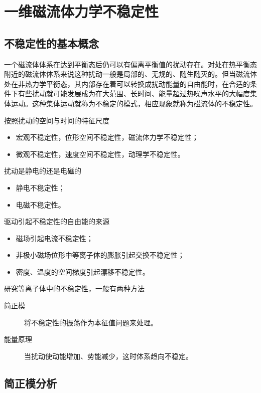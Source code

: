 
\chapter{一维磁流体力学不稳定性}

\section{不稳定性的基本概念}

一个磁流体体系在达到平衡态后仍可以有偏离平衡值的扰动存在。对处在热平衡态附近的磁流体体系来说这种扰动一般是局部的、无规的、随生随灭的。但当磁流体处在非热力学平衡态，其内部存在着可以转换成扰动能量的自由能时，在合适的条件下有些扰动就可能发展成为在大范围、长时间、能量超过热噪声水平的大幅度集体运动。这种集体运动就称为不稳定的模式，相应现象就称为磁流体的不稳定性。

按照扰动的空间与时间的特征尺度
\begin{itemize}
    \item 宏观不稳定性，位形空间不稳定性，磁流体力学不稳定性；
    \item 微观不稳定性，速度空间不稳定性，动理学不稳定性。
\end{itemize}

扰动是静电的还是电磁的
\begin{itemize}
    \item 静电不稳定性；
    \item 电磁不稳定性。
\end{itemize}

驱动引起不稳定性的自由能的来源
\begin{itemize}
    \item 磁场引起电流不稳定性；
    \item 非极小磁场位形中等离子体的膨胀引起交换不稳定性；
    \item 密度、温度的空间梯度引起漂移不稳定性。
\end{itemize}

研究等离子体中的不稳定性，一般有两种方法
\begin{description}
    \item[简正模] 将不稳定性的振荡作为本征值问题来处理。
    \item[能量原理] 当扰动使动能增加、势能减少，这时体系趋向不稳定。
\end{description}

\section{简正模分析}

